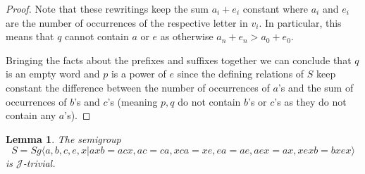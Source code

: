\documentclass{article}
\newtheorem{lemma}{Lemma}
\theoremstyle{definition}
\def\J{\mathcal J}
\begin{document}
\begin{proof}
Note that these rewritings keep  the sum $a_i + e_i$ constant where $a_i$ and $e_i$ are the number of occurrences of the respective letter in $v_i$. In particular, this means that $q$ cannot contain $a$ or $e$ as otherwise $a_n + e_n > a_0 + e_0$. 

Bringing the facts about the prefixes and suffixes together we can conclude that $q$ is an empty word and $p$ is a power of $e$ since the defining relations of $S$ keep constant the difference between the number of occurrences of $a$'s and the sum of occurrences of $b$'s and $c$'s (meaning $p,q$ do not contain $b$'s or $c$'s as they do not contain any $a$'s).
\end{proof}

\begin{lemma}\label{lem_weakj}
    The semigroup $$S = Sg \langle a,b,c,e,x | axb = acx, ac = ca, xca = xe, ea = ae, aex = ax, xexb = bxex \rangle$$ is $\J$-trivial.
\end{lemma}
\end{document}
